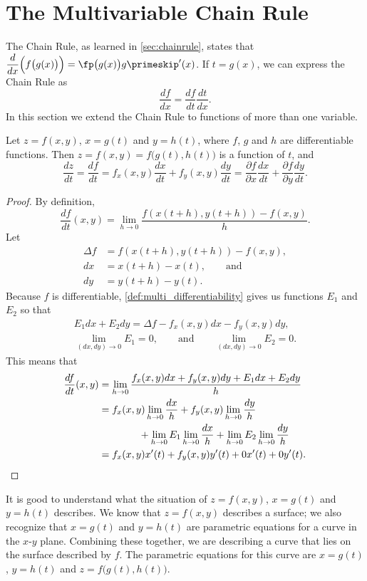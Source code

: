 \section{The Multivariable Chain Rule}\label{sec:multi_chain}

The Chain Rule, as learned in \autoref{sec:chainrule}, states that $\dfrac{d}{dx}\Big(f\big(g(x)\big)\Big) = \fp\big(g(x)\big)g\primeskip'(x)$. If $t=g(x)$, we can express the Chain Rule as 
\[\frac{df}{dx} = \frac{df}{dt}\frac{dt}{dx}.\]
In this section we extend the Chain Rule to functions of more than one variable.

{Let $z=f(x,y)$, $x=g(t)$ and $y=h(t)$, where $f$, $g$ and $h$ are differentiable functions. Then $z = f(x,y) = f\big(g(t),h(t)\big)$ is a function of $t$, and 
\[
	\frac{dz}{dt} = \frac{df}{dt}
	= f_x(x,y)\frac{dx}{dt}+f_y(x,y)\frac{dy}{dt}
	= \frac{\partial f}{\partial x}\frac{dx}{dt}
	+\frac{\partial f}{\partial y}\frac{dy}{dt}.
\]}

\begin{proof}
By definition,
\[\frac{df}{dt}(x,y)=\lim_{h\to0}\frac{f(x(t+h),y(t+h))-f(x,y)}h.\]
Let
\begin{align*}
 \Delta f&=f(x(t+h),y(t+h))-f(x,y), \\
 dx&=x(t+h)-x(t),\qquad\text{and} \\
 dy&=y(t+h)-y(t).
\end{align*}
Because $f$ is differentiable, \autoref{def:multi_differentiability} gives us functions $E_1$ and $E_2$ so that
\begin{gather*}
 E_1 dx+E_2 dy = \Delta f-f_x(x,y)dx-f_y(x,y)dy,\\
 \lim_{(dx,dy)\to0}E_1=0,\qquad\text{and}\qquad
 \lim_{(dx,dy)\to0}E_2=0.
\end{gather*}
This means that
\begin{align*}
 \frac{df}{dt}(x,y)
 &=\lim_{h\to0}\frac{f_x(x,y)dx+f_y(x,y)dy+E_1 dx+E_2 dy}h \\
 &=f_x(x,y)\lim_{h\to0}\frac{dx}h+f_y(x,y)\lim_{h\to0}\frac{dy}h \\
 &\qquad\qquad\mbox{}
 +\lim_{h\to0}E_1\lim_{h\to0}\frac{dx}h+\lim_{h\to0}E_2\lim_{h\to0}\frac{dy}h \\
 &=f_x(x,y)x'(t)+f_y(x,y)y'(t)+0x'(t)+0y'(t).\qedhere
\end{align*}
\end{proof}

It is good to understand what the situation of $z=f(x,y)$, $x=g(t)$ and $y=h(t)$ describes. We know that $z=f(x,y)$ describes a surface; we also recognize that $x=g(t)$ and $y=h(t)$ are parametric equations for a curve in the $x$-$y$ plane. Combining these together, we are describing a curve that lies on the surface described by $f$. The parametric equations for this curve are $x=g(t)$, $y=h(t)$ and $z=f\big(g(t),h(t)\big)$.

